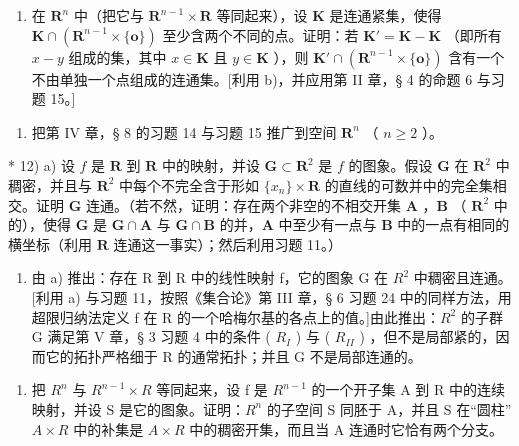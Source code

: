 \begin{enumerate}
\def\labelenumi{\alph{enumi})}
\setcounter{enumi}{2}
\tightlist
\item
  在 \(\mathbf{R}^n\) 中（把它与 \(\mathbf{R}^{n-1} \times \mathbf{R}\) 等同起来），设 \(\mathbf{K}\) 是连通紧集，使得 \(\mathbf{K} \cap (\mathbf{R}^{n-1} \times \{\mathbf{o}\})\) 至少含两个不同的点。证明：若 \(\mathbf{K}' = \mathbf{K} - \mathbf{K}\) （即所有 \(x - y\) 组成的集，其中 \(x \in \mathbf{K}\) 且 \(y \in \mathbf{K}\) ），则 \(\mathbf{K}' \cap (\mathbf{R}^{n-1} \times \{\mathbf{o}\})\) 含有一个不由单独一个点组成的连通集。{[}利用 b)，并应用第 II 章，§ 4 的命题 6 与习题 15。{]}
\end{enumerate}

\begin{enumerate}
\def\labelenumi{\arabic{enumi})}
\setcounter{enumi}{10}
\tightlist
\item
  把第 IV 章，§ 8 的习题 14 与习题 15 推广到空间 \(\mathbf{R}^n\) （ \(n \geqslant 2\) ）。
\end{enumerate}

* 12) a) 设 \(f\) 是 \(\mathbf{R}\) 到 \(\mathbf{R}\) 中的映射，并设 \(\mathbf{G} \subset \mathbf{R}^2\) 是 \(f\) 的图象。假设 \(\mathbf{G}\) 在 \(\mathbf{R}^2\) 中稠密，并且与 \(\mathbf{R}^2\) 中每个不完全含于形如 \(\{x_n\} \times \mathbf{R}\) 的直线的可数并中的完全集相交。证明 \(\mathbf{G}\) 连通。（若不然，证明：存在两个非空的不相交开集 \(\mathbf{A}\) ，\(\mathbf{B}\) （ \(\mathbf{R}^2\) 中的），使得 \(\mathbf{G}\) 是 \(\mathbf{G} \cap \mathbf{A}\) 与 \(\mathbf{G} \cap \mathbf{B}\) 的并，\(\mathbf{A}\) 中至少有一点与 \(\mathbf{B}\) 中的一点有相同的横坐标（利用 \(\mathbf{R}\) 连通这一事实）；然后利用习题 11。）

\begin{enumerate}
\def\labelenumi{\alph{enumi})}
\setcounter{enumi}{1}
\tightlist
\item
  由 a) 推出：存在 R 到 R 中的线性映射 f，它的图象 G 在 \(R^{2}\) 中稠密且连通。{[}利用 a) 与习题 11，按照《集合论》第 III 章，§ 6 习题 24 中的同样方法，用超限归纳法定义 f 在 R 的一个哈梅尔基的各点上的值。{]}由此推出：\(R^{2}\) 的子群 G 满足第 V 章，§ 3 习题 4 中的条件 ( \(R_{I}\) ) 与 ( \(R_{II}\) ) ，但不是局部紧的，因而它的拓扑严格细于 R 的通常拓扑；并且 G 不是局部连通的。
\end{enumerate}

\begin{enumerate}
\def\labelenumi{\arabic{enumi})}
\setcounter{enumi}{12}
\tightlist
\item
  把 \(R^{n}\) 与 \(R^{n-1} \times R\) 等同起来，设 f 是 \(R^{n-1}\) 的一个开子集 A 到 R 中的连续映射，并设 S 是它的图象。证明：\(R^{n}\) 的子空间 S 同胚于 A，并且 S 在“圆柱” \(A \times R\) 中的补集是 \(A \times R\) 中的稠密开集，而且当 A 连通时它恰有两个分支。
\end{enumerate}

